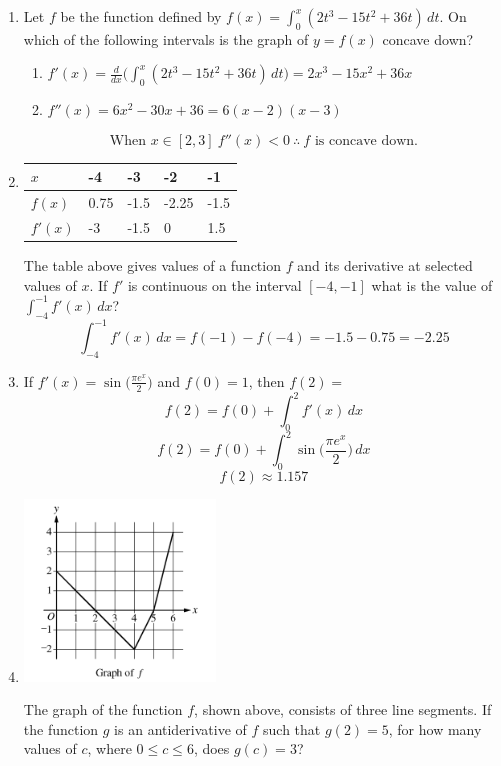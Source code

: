 \documentclass[12pt]{article}
\begin{document}
\begin{enumerate}
    \item Let $f$ be the function defined by $f(x)=\int_{0}^{x} (2t^3-15t^2+36t) \, dt$. On which of the following intervals is the graph of $y=f(x)$ concave down?
    \begin{enumerate}
        \item $f'(x)=\frac{d}{dx}\big(\int_{0}^{x} (2t^3-15t^2+36t) \, dt \big) = 2x^3-15x^2+36x$
        \item $f''(x)=6x^2-30x+36 = 6(x-2)(x-3)$
    \end{enumerate}
$$\boxed{\text{When } x\in[2,3] \: f''(x)<0 \: \therefore \: f \text{ is concave down.}}$$
\item 
\begin{table}[h]
\centering
\begin{tabular}{|l||l|l|l|l|}
\hline
$x$ & -4 & -3 & -2 & -1 \\ \hline
$f(x)$ & 0.75 & -1.5 & -2.25 & -1.5 \\ \hline
$f'(x)$ & -3 & -1.5 & 0 & 1.5 \\ \hline
\end{tabular}
\end{table}
The table above gives values of a function $f$ and its derivative at selected values of $x$. If $f'$ is continuous on the interval $[-4,-1]$ what is the value of $\int_{-4}^{-1} f'(x) \, dx$?
$$\int_{-4}^{-1} f'(x) \, dx = f(-1)-f(-4) = -1.5-0.75=\boxed{-2.25}$$
\item If $f'(x)=\sin\big(\frac{\pi e^x}{2}\big)$ and $f(0)=1$, then $f(2)=$
$$f(2)=f(0)+\int_{0}^{2}f'(x) \, dx$$
$$f(2)=f(0)+\int_{0}^{2}\sin\biggr(\frac{\pi e^x}{2}\biggr) \, dx$$
$$\boxed{f(2) \approx 1.157}$$
\item
\begin{center}
    \includegraphics[width=2in]{original-19.png}
\end{center}
The graph of the function $f$, shown above, consists of three line segments. If the function $g$ is an antiderivative of $f$ such that $g(2)=5$, for how many values of $c$, where $0 \leq c \leq 6$, does $g(c) = 3$?

\end{enumerate}
\end{document}
